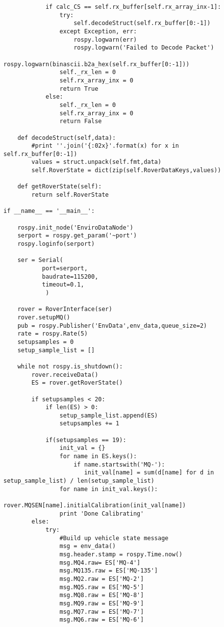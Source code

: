 \begin{verbatim}
            if calc_CS == self.rx_buffer[self.rx_array_inx-1]:
                try:
                    self.decodeStruct(self.rx_buffer[0:-1])
                except Exception, err:
                    rospy.logwarn(err)
                    rospy.logwarn('Failed to Decode Packet')
                    rospy.logwarn(binascii.b2a_hex(self.rx_buffer[0:-1]))
                self._rx_len = 0
                self.rx_array_inx = 0
                return True
            else:
                self._rx_len = 0
                self.rx_array_inx = 0
                return False

    def decodeStruct(self,data):
        #print ''.join('{:02x}'.format(x) for x in self.rx_buffer[0:-1])
        values = struct.unpack(self.fmt,data)
        self.RoverState = dict(zip(self.RoverDataKeys,values))

    def getRoverState(self):
        return self.RoverState

if __name__ == '__main__':

    rospy.init_node('EnviroDataNode')
    serport = rospy.get_param('~port')
    rospy.loginfo(serport)

    ser = Serial(
           port=serport,
           baudrate=115200,
           timeout=0.1,
            )

    rover = RoverInterface(ser)
    rover.setupMQ()
    pub = rospy.Publisher('EnvData',env_data,queue_size=2)
    rate = rospy.Rate(5)
    setupsamples = 0
    setup_sample_list = []

    while not rospy.is_shutdown():
        rover.receiveData()
        ES = rover.getRoverState()
        
        if setupsamples < 20:
            if len(ES) > 0:
                setup_sample_list.append(ES)
                setupsamples += 1

            if(setupsamples == 19):
                init_val = {}
                for name in ES.keys():
                    if name.startswith('MQ-'):
                       init_val[name] = sum(d[name] for d in setup_sample_list) / len(setup_sample_list)
                for name in init_val.keys():
                    rover.MQSEN[name].initialCalibration(init_val[name])
                print 'Done Calibrating'
        else:
            try:
                #Build up vehicle state message
                msg = env_data()
                msg.header.stamp = rospy.Time.now()
                msg.MQ4.raw= ES['MQ-4']
                msg.MQ135.raw = ES['MQ-135']
                msg.MQ2.raw = ES['MQ-2']
                msg.MQ5.raw = ES['MQ-5']
                msg.MQ8.raw = ES['MQ-8']
                msg.MQ9.raw = ES['MQ-9']
                msg.MQ7.raw = ES['MQ-7']
                msg.MQ6.raw = ES['MQ-6']


\end{verbatim}
